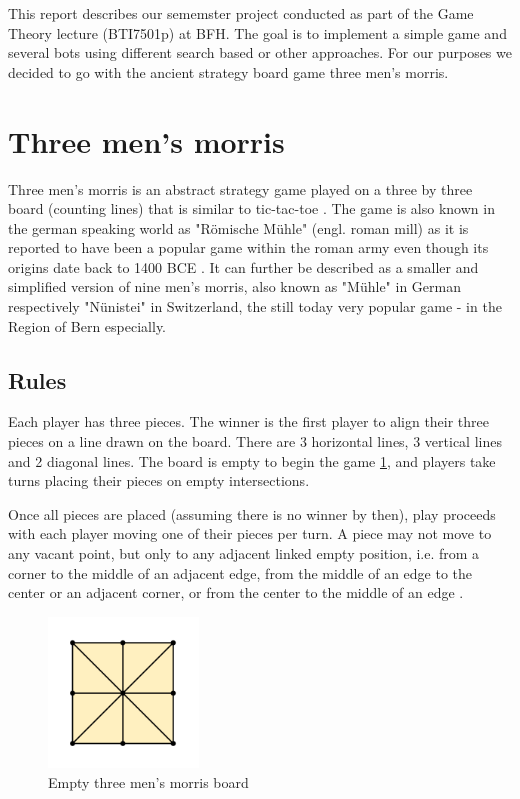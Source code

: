 This report describes our sememster project conducted as part
of the Game Theory lecture (BTI7501p) at BFH.
The goal is to implement a simple game and several
bots using different search based or other approaches.
For our purposes we decided to go with the ancient
strategy board game three men's morris.

\section{Three men's morris}
Three men's morris is an abstract strategy game played on a three by three board
(counting lines) that is similar to tic-tac-toe \cite{wiki}.
The game is also known in the german speaking world as "Römische Mühle" (engl. roman mill)
as it is reported to have been a popular game within the roman army \cite{romanmill}
even though its origins date back to 1400 BCE \cite{threemensmorris}.
It can further be described as a smaller and simplified version of nine men's morris,
also known as "Mühle" in German respectively "Nünistei" in Switzerland,
the still today very popular game - in the Region of Bern especially.

\subsection{Rules}
Each player has three pieces.
The winner is the first player to align their three pieces on a line drawn on the board.
There are 3 horizontal lines, 3 vertical lines and 2 diagonal lines.
The board is empty to begin the game \ref{fig:emptyboard}, and players take turns placing their pieces on empty intersections.

Once all pieces are placed (assuming there is no winner by then), play proceeds with each player moving one of their pieces per turn.
A piece may not move to any vacant point, but only to any adjacent linked empty position, i.e. from a corner to the middle of an adjacent edge, from the middle of an edge to the center or an adjacent corner, or from the center to the middle of an edge \cite{wiki}.

\begin{figure}[hbt!]
  \begin{center}
    \captionsetup{justification=centering}
    \includegraphics[width=4cm]{emptyboard.png}
    \caption{Empty three men's morris board \cite{wiki-image}}
    \label{fig:emptyboard}
  \end{center}
\end{figure}
